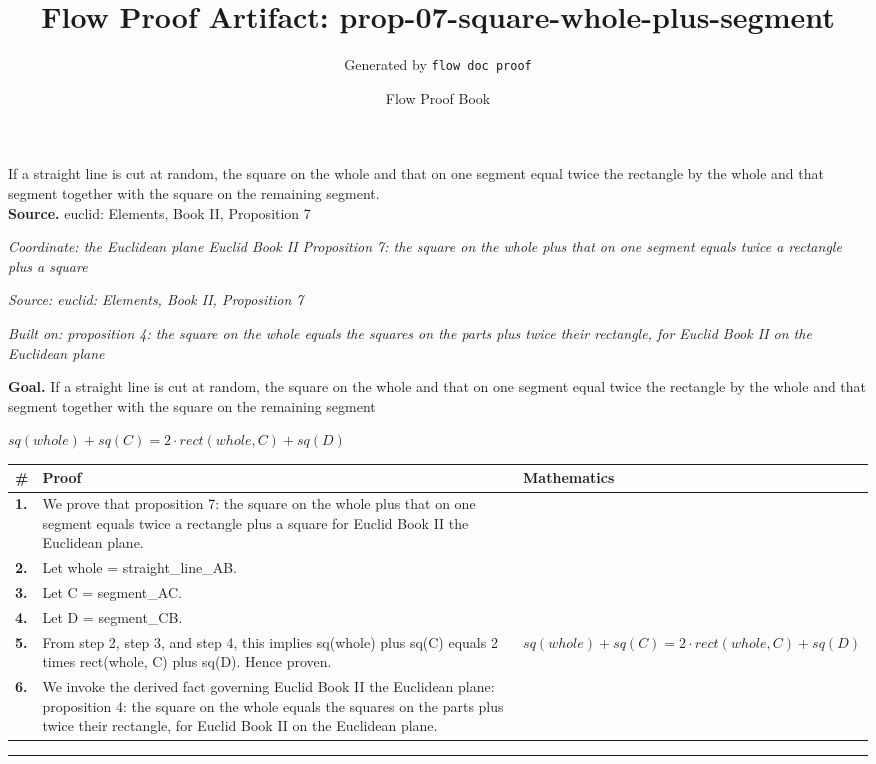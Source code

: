 \documentclass[11pt]{article}
\title{Flow Proof Artifact: prop-07-square-whole-plus-segment}
\author{Generated by \texttt{flow doc proof}}
\date{Flow Proof Book}
\theoremstyle{definition}
\begin{document}
\maketitle
If a straight line is cut at random, the square on the whole and that on one segment equal twice the rectangle by the whole and that segment together with the square on the remaining segment.\\[0.5em]
\textbf{Source.} euclid: Elements, Book II, Proposition 7\\[0.5em]
\bigskip
{}\par
\smallskip\noindent\textit{Coordinate: the Euclidean plane \cdot Euclid Book II \cdot Proposition 7: the square on the whole plus that on one segment equals twice a rectangle plus a square}\par
\smallskip\noindent\textit{Source: euclid: Elements, Book II, Proposition 7}\par
\smallskip\noindent\textit{Built on: proposition 4: the square on the whole equals the squares on the parts plus twice their rectangle, for Euclid Book II on the Euclidean plane}\par
\medskip
\noindent\textbf{Goal.} If a straight line is cut at random, the square on the whole and that on one segment equal twice the rectangle by the whole and that segment together with the square on the remaining segment\par
\noindent$\displaystyle sq(whole) + sq(C) = 2 \cdot rect(whole, C) + sq(D)$\par
\medskip
\noindent
\begin{tabular}{@{} >{\raggedright\arraybackslash}p{} >{\raggedright\arraybackslash}p{} >{\raggedleft\arraybackslash}p{} @{}}
\textbf{\#} & \textbf{Proof} & \textbf{Mathematics} \\
\midrule
\textbf{1.} & We prove that proposition 7: the square on the whole plus that on one segment equals twice a rectangle plus a square for Euclid Book II the Euclidean plane. & \\[0.45em]
\textbf{2.} & Let whole = straight\_line\_AB. & \\[0.45em]
\textbf{3.} & Let C = segment\_AC. & \\[0.45em]
\textbf{4.} & Let D = segment\_CB. & \\[0.45em]
\textbf{5.} & From step 2, step 3, and step 4, this implies sq(whole) plus sq(C) equals 2 times rect(whole, C) plus sq(D). Hence proven. & $\displaystyle sq(whole) + sq(C) = 2 \cdot rect(whole, C) + sq(D)$ \\[0.45em]
\textbf{6.} & We invoke the derived fact governing Euclid Book II the Euclidean plane: proposition 4: the square on the whole equals the squares on the parts plus twice their rectangle, for Euclid Book II on the Euclidean plane. & \\[0.45em]
\bottomrule
\end{tabular}
\label{thm:Geometry-Euclid Book II-proposition_7_the_square_on_the_whole_plus_that_on_one_segment_equals_twice_a_rectangle_plus_a_square}
\par\medskip\hrule
\end{document}
